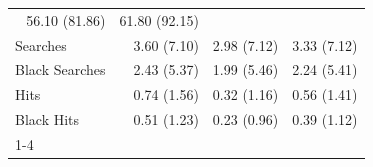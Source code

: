 \begin{table}[!h]
\begin{tabular}{llll}
  \multicolumn{1}{r}{56.10 (81.86)} &
  \multicolumn{1}{r}{61.80 (92.15)} \\
\multicolumn{1}{l}{\hspace{1em}Searches} &
  \multicolumn{1}{r}{3.60 (7.10)} &
  \multicolumn{1}{r}{2.98 (7.12)} &
  \multicolumn{1}{r}{3.33 (7.12)} \\
\multicolumn{1}{l}{\hspace{1em}Black Searches} &
  \multicolumn{1}{r}{2.43 (5.37)} &
  \multicolumn{1}{r}{1.99 (5.46)} &
  \multicolumn{1}{r}{2.24 (5.41)} \\
\multicolumn{1}{l}{\hspace{1em}Hits} &
  \multicolumn{1}{r}{0.74 (1.56)} &
  \multicolumn{1}{r}{0.32 (1.16)} &
  \multicolumn{1}{r}{0.56 (1.41)} \\
\multicolumn{1}{l}{\hspace{1em}Black Hits} &
  \multicolumn{1}{r}{0.51 (1.23)} &
  \multicolumn{1}{r}{0.23 (0.96)} &
  \multicolumn{1}{r}{0.39 (1.12)} \\
\cline{1-4}
\end{tabular}
\end{table}
